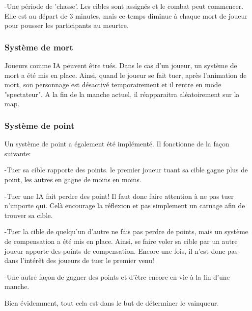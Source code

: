 	-Une période de 'chasse'. Les cibles sont assignés et le combat peut commencer. Elle est au départ de 3 minutes, mais ce temps
	 diminue à chaque mort de joueur pour pousser les participants au meurtre.

\subsubsection{Système de mort}
    Joueurs comme IA peuvent être tués. Dans le cas d'un joueur, un système de mort a été mis en place. Ainsi,
    quand le joueur se fait tuer, après l'animation de mort, son personnage est désactivé temporairement et il rentre
    en mode "spectateur". A la fin de la manche actuel, il réapparaitra aléatoirement sur la map.

\subsubsection{Système de point}
    Un système de point a également été implémenté. Il fonctionne de la façon suivante:
    
	-Tuer sa cible rapporte des points. le premier joueur tuant sa cible gagne plus de point, les autres en gagne de moins en moins.
	
	-Tuer une IA fait perdre des point! Il faut donc faire attention à ne pas tuer n'importe qui. Celà encourage la réflexion et pas 	 simplement un carnage afin de trouver sa cible.
	
	-Tuer la cible de quelqu'un d'autre ne fais pas perdre de points, mais un système de compensation a été mis en place. Ainsi, se 	faire voler sa cible par un autre joueur apporte des points de compensation. Encore une fois, il n'est donc pas dans l'intérêt 
	des joueurs de tuer le premier venu!

	-Une autre façon de gagner des points et d'être encore en vie à la fin d'une manche.

    Bien évidemment, tout cela est dans le but de déterminer le vainqueur.
